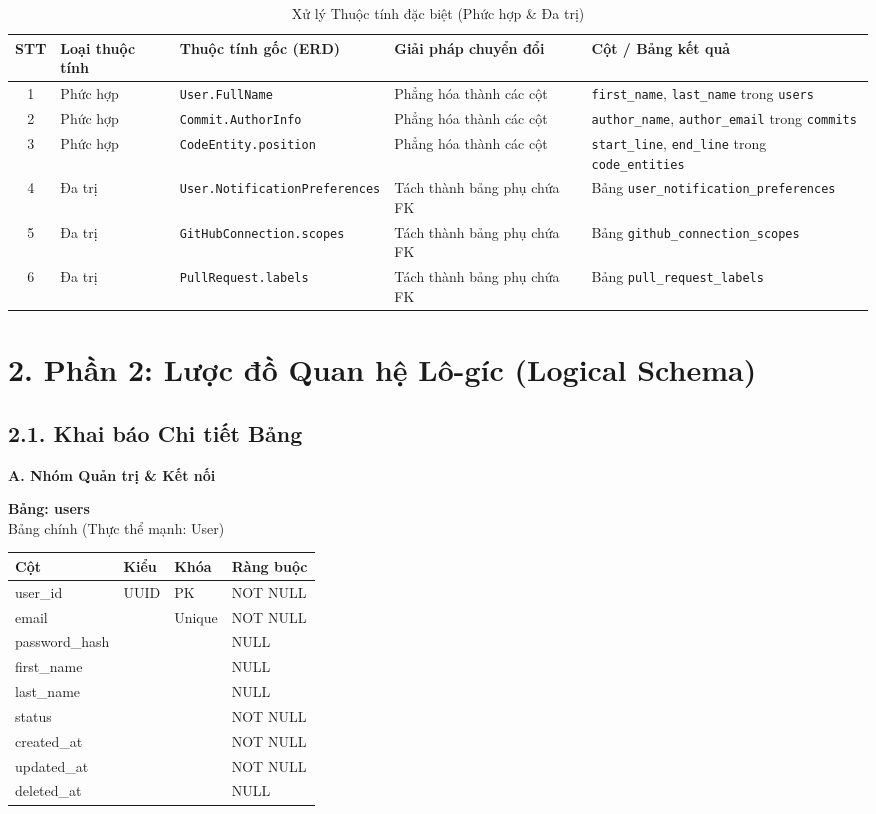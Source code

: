 \begin{longtable}{|c|p{2.2cm}|p{3.5cm}|p{3.8cm}|p{4cm}|}
\caption{Xử lý Thuộc tính đặc biệt (Phức hợp \& Đa trị)} \\
\hline
\textbf{STT} & \textbf{Loại thuộc tính} & \textbf{Thuộc tính gốc (ERD)} & \textbf{Giải pháp chuyển đổi} & \textbf{Cột / Bảng kết quả} \\ \hline
\endhead

1 & Phức hợp & \texttt{User.FullName} & Phẳng hóa thành các cột & \texttt{first\_name}, \texttt{last\_name} trong \texttt{users} \\ \hline
2 & Phức hợp & \texttt{Commit.AuthorInfo} & Phẳng hóa thành các cột & \texttt{author\_name}, \texttt{author\_email} trong \texttt{commits} \\ \hline
3 & Phức hợp & \texttt{CodeEntity.position} & Phẳng hóa thành các cột & \texttt{start\_line}, \texttt{end\_line} trong \texttt{code\_entities} \\ \hline
4 & Đa trị & \texttt{User.NotificationPreferences} & Tách thành bảng phụ chứa FK & Bảng \texttt{user\_notification\_preferences} \\ \hline
5 & Đa trị & \texttt{GitHubConnection.scopes} & Tách thành bảng phụ chứa FK & Bảng \texttt{github\_connection\_scopes} \\ \hline
6 & Đa trị & \texttt{PullRequest.labels} & Tách thành bảng phụ chứa FK & Bảng \texttt{pull\_request\_labels} \\ \hline
\end{longtable}
\section*{2. Phần 2: Lược đồ Quan hệ Lô-gíc (Logical Schema)}
\subsection*{2.1. Khai báo Chi tiết Bảng}

\textbf{A. Nhóm Quản trị \& Kết nối}

\textbf{Bảng: users}\\
Bảng chính (Thực thể mạnh: User)
\begin{table}[H]
\centering
\begin{tabular}{|l|l|l|l|}
\hline
\textbf{Cột} & \textbf{Kiểu} & \textbf{Khóa} & \textbf{Ràng buộc} \\ \hline
user\_id & UUID & PK & NOT NULL \\ \hline
email & & Unique & NOT NULL \\ \hline
password\_hash & & & NULL \\ \hline
first\_name & & & NULL \\ \hline
last\_name & & & NULL \\ \hline
status & & & NOT NULL \\ \hline
created\_at & & & NOT NULL \\ \hline
updated\_at & & & NOT NULL \\ \hline
deleted\_at & & & NULL \\ \hline
\end{tabular}
\end{table}


